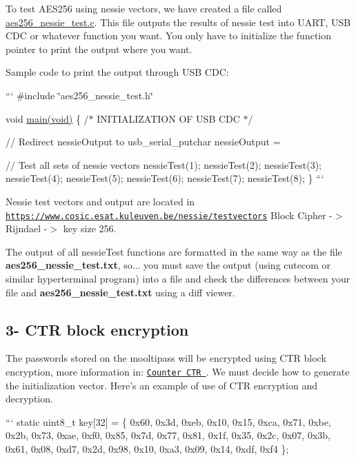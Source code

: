 To test A\+E\+S256 using nessie vectors, we have created a file called \hyperlink{aes256__nessie__test_8c}{aes256\+\_\+nessie\+\_\+test.\+c}. This file outputs the results of nessie test into U\+A\+R\+T, U\+S\+B C\+D\+C or whatever function you want. You only have to initialize the function pointer to print the output where you want.

Sample code to print the output through U\+S\+B C\+D\+C\+:

``` \#include \char`\"{}aes256\+\_\+nessie\+\_\+test.\+h\char`\"{}

void \hyperlink{mooltipass_8c_a568b3afc214ba30be5bf526d6b27b611}{main(void)} \{ /$\ast$ I\+N\+I\+T\+I\+A\+L\+I\+Z\+A\+T\+I\+O\+N O\+F U\+S\+B C\+D\+C $\ast$/

// Redirect nessie\+Output to usb\+\_\+serial\+\_\+putchar nessie\+Output = 

// Test all sets of nessie vectors nessie\+Test(1); nessie\+Test(2); nessie\+Test(3); nessie\+Test(4); nessie\+Test(5); nessie\+Test(6); nessie\+Test(7); nessie\+Test(8); \} ```

Nessie test vectors and output are located in \href{https://www.cosic.esat.kuleuven.be/nessie/testvectors}{\tt https\+://www.\+cosic.\+esat.\+kuleuven.\+be/nessie/testvectors} Block Cipher -\/$>$ Rijndael -\/$>$ key size 256.

The output of all nessie\+Test functions are formatted in the same way as the file {\bfseries aes256\+\_\+nessie\+\_\+test.\+txt}, so... you must save the output (using cutecom or similar hyperterminal program) into a file and check the differences between your file and {\bfseries aes256\+\_\+nessie\+\_\+test.\+txt} using a diff viewer.

\subsection*{3-\/ C\+T\+R block encryption }

The passwords stored on the mooltipass will be encrypted using C\+T\+R block encryption, more information in\+: \href{http://en.wikipedia.org/wiki/Block_cipher_mode_of_operation#Counter_.28CTR.29}{\tt Counter C\+T\+R }. We must decide how to generate the initialization vector. Here's an example of use of C\+T\+R encryption and decryption.

``` static uint8\+\_\+t key\mbox{[}32\mbox{]} = \{ 0x60, 0x3d, 0xeb, 0x10, 0x15, 0xca, 0x71, 0xbe, 0x2b, 0x73, 0xae, 0xf0, 0x85, 0x7d, 0x77, 0x81, 0x1f, 0x35, 0x2c, 0x07, 0x3b, 0x61, 0x08, 0xd7, 0x2d, 0x98, 0x10, 0xa3, 0x09, 0x14, 0xdf, 0xf4 \};

